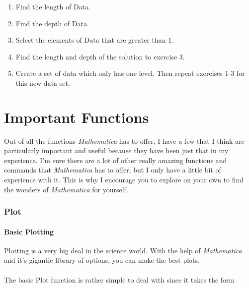 \documentclass[11pt,a4paper,twoside]{article}
\begin{document}
			\begin{enumerate}
			
				\item %
				
					Find the length of Data.
					
				\item %
				
					Find the depth of Data.
					
				\item %
				
					Select the elements of Data that are greater than 1.
					
				\item %
				
					Find the length and depth of the solution to exercise 3.
					
				\item %
				
					Create a set of data which only has one level.  Then repeat exercises 1-3 for this new data set.
			
			\end{enumerate}
			
\newpage
			
	\part{Important Functions}
	
		Out of all the functions \textit{Mathematica} has to offer, I have a few that I think are particularly important and useful because they have been just that in my experience.  I'm sure there are a lot of other really amazing functions and commands that \textit{Mathematica} has to offer, but I only have a little bit of experience with it.  This is why I encourage you to explore on your own to find the wonders of \textit{Mathematica} for yourself.
		
		\section{Plot}
		
			\subsection{Basic Plotting}
		
				Plotting is a very big deal in the science world.  With the help of \textit{Mathematica} and it's gigantic library of options, you can make the best plots.
				\\
				\\
				The basic Plot function is rather simple to deal with since it takes the form
			
\end{document}

